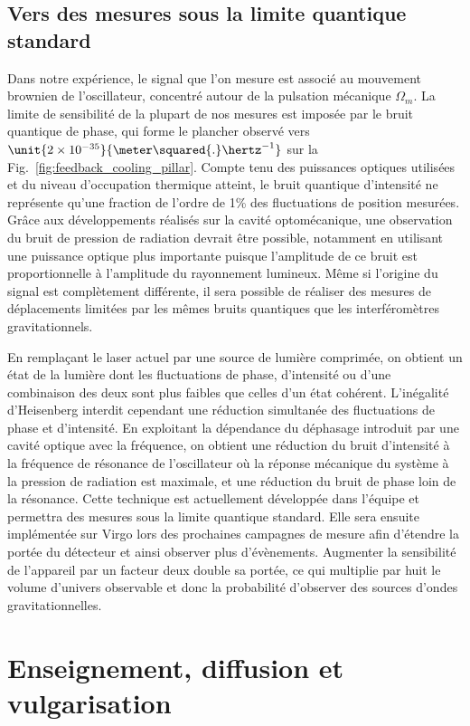 \documentclass[12pt,a4paper]{article}
\begin{document}
\subsection{Vers des mesures sous la limite quantique standard}
\label{sec:prospects}

Dans notre expérience, le signal que l'on mesure est associé au mouvement brownien de l'oscillateur, concentré autour de la pulsation mécanique $\Omega_m$.
La limite de sensibilité de la plupart de nos mesures est imposée par le bruit quantique de phase, qui forme le plancher observé vers $\unit{2\times10^{-35}}{\meter\squared{.}\hertz^{-1}}$ sur la Fig.~\ref{fig:feedback_cooling_pillar}.
Compte tenu des puissances optiques utilisées et du niveau d'occupation thermique atteint, le bruit quantique d'intensité ne représente qu'une fraction de l'ordre de \unit{1}{\%} des fluctuations de position mesurées.
Grâce aux développements réalisés sur la cavité optomécanique, une observation du bruit de pression de radiation devrait être possible, notamment en utilisant une puissance optique plus importante puisque l'amplitude de ce bruit est proportionnelle à l'amplitude du rayonnement lumineux.
Même si l'origine du signal est complètement différente, il sera possible de réaliser des mesures de déplacements limitées par les mêmes bruits quantiques que les interféromètres gravitationnels.

En remplaçant le laser actuel par une source de lumière comprimée, on obtient un état de la lumière dont les fluctuations de phase, d'intensité ou d'une combinaison des deux sont plus faibles que celles d'un état cohérent.
L'inégalité d'Heisenberg interdit cependant une réduction simultanée des fluctuations de phase et d'intensité.
En exploitant la dépendance du déphasage introduit par une cavité optique avec la fréquence, on obtient une réduction du bruit d'intensité à la fréquence de résonance de l'oscillateur où la réponse mécanique du système à la pression de radiation est maximale,  et une réduction du bruit de phase loin de la résonance.
Cette technique est actuellement développée dans l'équipe et permettra des mesures sous la limite quantique standard.
Elle sera ensuite implémentée sur Virgo lors des prochaines campagnes de mesure afin d'étendre la portée du détecteur et ainsi observer plus d'évènements.
Augmenter la sensibilité de l'appareil par un facteur deux double sa portée, ce qui multiplie par huit le volume d'univers observable et donc la probabilité d'observer des sources d'ondes gravitationnelles.

\section{Enseignement, diffusion et vulgarisation}
\end{document}
